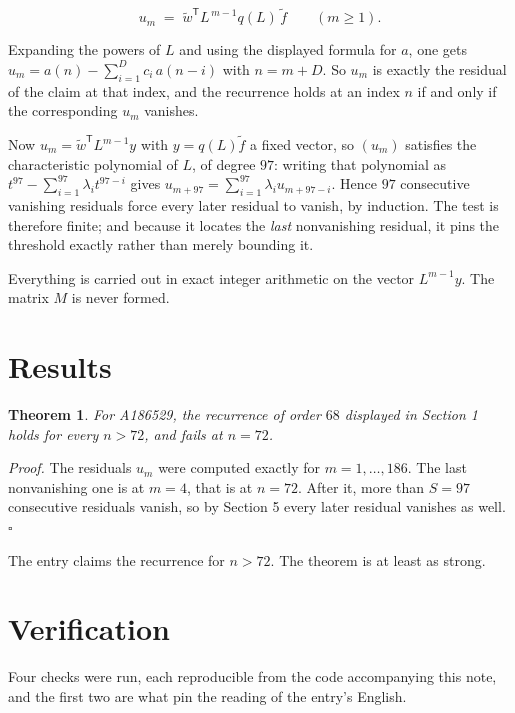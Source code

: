 \documentclass[11pt]{article}
\newtheorem{theorem}{Theorem}
\theoremstyle{definition}
\begin{document}
\[u_m \;=\; \tilde w^{\mathsf T} L^{\,m-1} q(L)\,\tilde f \qquad (m \ge 1).\]

Expanding the powers of $L$ and using the displayed formula for $a$, one gets $u_m = a(n) - \sum_{i=1}^{D} c_i\,a(n-i)$ with $n = m + D$. So $u_m$ is exactly the residual of the claim at that index, and the recurrence holds at an index $n$ if and only if the corresponding $u_m$ vanishes.

Now $u_m = \tilde w^{\mathsf T} L^{m-1} y$ with $y = q(L)\tilde f$ a fixed vector, so $(u_m)$ satisfies the characteristic polynomial of $L$, of degree $97$: writing that polynomial as $t^{97} - \sum_{i=1}^{97} \lambda_i t^{97-i}$ gives $u_{m+97} = \sum_{i=1}^{97} \lambda_i u_{m+97-i}$. Hence $97$ consecutive vanishing residuals force every later residual to vanish, by induction. The test is therefore finite; and because it locates the {\itshape last} nonvanishing residual, it pins the threshold exactly rather than merely bounding it.

Everything is carried out in exact integer arithmetic on the vector $L^{m-1}y$. The matrix $M$ is never formed.

\section{Results}

\begin{theorem} For A186529, the recurrence of order $68$ displayed in Section 1 holds for every $n > 72$, and fails at $n = 72$.\end{theorem}

{\itshape Proof.} The residuals $u_m$ were computed exactly for $m = 1,\dots,186$. The last nonvanishing one is at $m = 4$, that is at $n = 72$. After it, more than $S = 97$ consecutive residuals vanish, so by Section 5 every later residual vanishes as well. $\square$

The entry claims the recurrence for $n > 72$. The theorem is at least as strong.

\section{Verification}

Four checks were run, each reproducible from the code accompanying this note, and the first two are what pin the reading of the entry's English.
\end{document}
